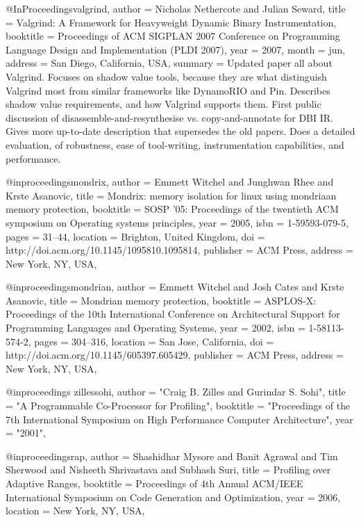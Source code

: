@InProceedings{valgrind,
    author      = {Nicholas Nethercote and Julian Seward},
    title       = {Valgrind: A Framework for Heavyweight Dynamic Binary
                   Instrumentation},
    booktitle   = {Proceedings of ACM SIGPLAN 2007 Conference on Programming
                   Language Design and Implementation (PLDI 2007)},
    year        = 2007,
    month       = jun,
    address     = {San Diego, California, USA},
    summary     = {Updated paper all about Valgrind.  Focuses on shadow
                   value tools, because they are what distinguish Valgrind
                   most from similar frameworks like DynamoRIO and Pin.
                   Describes shadow value requirements, and how Valgrind
                   supports them.  First public discussion of
                   disassemble-and-resynthesise vs. copy-and-annotate for
                   DBI IR.  Gives more up-to-date description that
                   supersedes the old papers.  Does a detailed evaluation,
                   of robustness, ease of tool-writing, instrumentation
                   capabilities, and performance.}
}

@inproceedings{mondrix,
 author = {Emmett Witchel and Junghwan Rhee and Krste Asanovic},
 title = {Mondrix: memory isolation for linux using mondriaan memory protection},
 booktitle = {SOSP '05: Proceedings of the twentieth ACM symposium on Operating systems principles},
 year = {2005},
 isbn = {1-59593-079-5},
 pages = {31--44},
 location = {Brighton, United Kingdom},
 doi = {http://doi.acm.org/10.1145/1095810.1095814},
 publisher = {ACM Press},
 address = {New York, NY, USA},
 }

@inproceedings{mondrian,
 author = {Emmett Witchel and Josh Cates and Krste Asanovic},
 title = {Mondrian memory protection},
 booktitle = {ASPLOS-X: Proceedings of the 10th International Conference on Architectural Support for Programming Languages and Operating Systems},
 year = {2002},
 isbn = {1-58113-574-2},
 pages = {304--316},
 location = {San Jose, California},
 doi = {http://doi.acm.org/10.1145/605397.605429},
 publisher = {ACM Press},
 address = {New York, NY, USA},
 }

@inproceedings{ zillessohi,
    author = "Craig B. Zilles and Gurindar S. Sohi",
    title = "A Programmable Co-Processor for Profiling",
    booktitle = "Proceedings of the 7th International Symposium on High Performance Computer Architecture",
    year = "2001",
}

@inproceedings{rap,
 author = {Shashidhar Mysore and Banit Agrawal and Tim Sherwood and Nisheeth Shrivastava and Subhash Suri},
 title = {Profiling over Adaptive Ranges},
 booktitle = {Proceedings of 4th Annual ACM/IEEE International Symposium on Code Generation and Optimization},
 year = {2006},
 location = {New York, NY, USA},
 }

